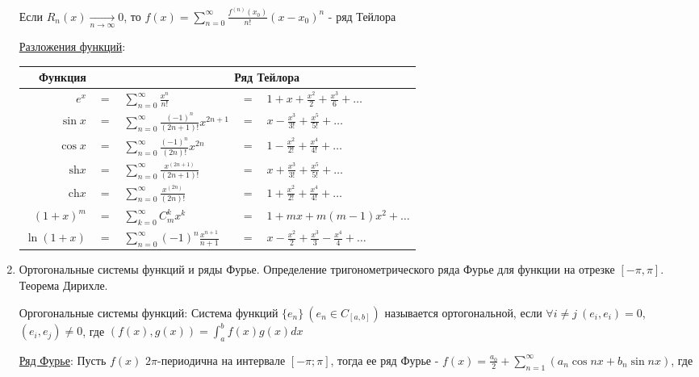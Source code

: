 \documentclass[12pt]{article}
\begin{document}
\begin{enumerate}
    \Ths Если $R_n(x) \underset{n \to \infty}{\longrightarrow} 0$, то $f(x) = \sum_{n = 0}^\infty \frac{f^{(n)}(x_0)}{n!} (x - x_0)^n$ - ряд Тейлора

    \hyperlink{taylorsseriesoffunctions}{Разложения функций}:

    \begin{tabular}{rclcl}
        Функция & & \multicolumn{3}{c}{Ряд Тейлора} \\
        \hline
        $e^x$ & $=$ & $\sum_{n = 0}^\infty \frac{x^n}{n!}$ & $=$ & $1 + x + \frac{x^2}{2} + \frac{x^3}{6} + \dots$ \\
        \hline
        $\sin x$ & $=$ & $\sum_{n = 0}^\infty \frac{(-1)^n}{(2n + 1)!}x^{2n + 1}$ & $=$ & $x - \frac{x^3}{3!} + \frac{x^5}{5!} + \dots$ \\
        \hline
        $\cos x$ & $=$ & $\sum_{n = 0}^\infty \frac{(-1)^n}{(2n)!}x^{2n}$ & $=$ & $1 - \frac{x^2}{2!} + \frac{x^4}{4!} + \dots$ \\
        \hline
        $\mathrm{sh} x$ & $=$ & $\sum_{n = 0}^\infty \frac{x^{(2n + 1)}}{(2n + 1)!}$ & $=$ & $x + \frac{x^3}{3!} + \frac{x^5}{5!} + \dots$\\
        \hline
        $\mathrm{ch} x$ & $=$ & $\sum_{n = 0}^\infty \frac{x^{(2n)}}{(2n)!}$  & $=$ & $1 + \frac{x^2}{2!} + \frac{x^4}{4!} + \dots$\\
        \hline 
        $(1 + x)^m$ & $=$ & $\sum_{k = 0}^\infty C_m^k x^k$ & $=$ & $1 + mx + m(m - 1)x^2 + \dots$\\
        \hline
        $\ln(1 + x)$ & $=$ & $\sum_{n = 0}^\infty (-1)^n \frac{x^{n + 1}}{n + 1}$ & $=$ & $x - \frac{x^2}{2} + \frac{x^3}{3} - \frac{x^4}{4} + \dots$ \\
    \end{tabular}

    \item Ортогональные системы функций и ряды Фурье. Определение тригонометрического ряда
    Фурье для функции на отрезке $[-\pi, \pi]$. Теорема Дирихле.

    Оргогональные системы функций: 
    Система функций $\{e_n\} \ (e_n \in C_{[a, b]})$ называется ортогональной, 
    если $\forall i \neq j \ (e_i, e_i) = 0$, $(e_i, e_j) \neq 0$, где
    $(f(x), g(x)) = \int_{a}^{b} f(x) g(x) dx$

    \hyperlink{fouriersseries}{Ряд Фурье}: Пусть $f(x)$ $2\pi$-периодична на интервале $[-\pi;\pi]$, тогда ее ряд Фурье - $f(x) = \frac{a_0}{2} + \sum_{n = 1}^\infty (a_n \cos nx + b_n \sin nx)$, где 
    

\end{enumerate}
\end{document}
